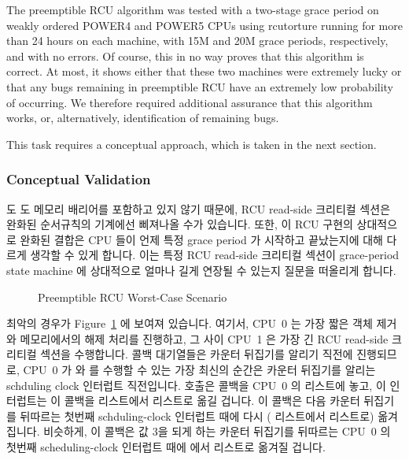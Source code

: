 The preemptible RCU algorithm was tested with a two-stage grace period
on weakly ordered POWER4 and POWER5 CPUs using rcutorture running for
more than 24 hours on each machine, with 15M and 20M grace periods,
respectively, and with no errors.
Of course, this in no way proves that this algorithm is correct.
At most, it shows either that these two machines were extremely
lucky or that any bugs remaining in preemptible RCU have an extremely
low probability of occurring.
We therefore required additional assurance that this algorithm works,
or, alternatively, identification of remaining bugs.

This task requires a conceptual approach,
which is taken in the next section.
\fi

\subsubsection{Conceptual Validation}
\label{app:rcuimpl:Conceptual Validation}

 도  도 메모리 배리어를 포함하고 있지
않기 때문에, RCU read-side 크리티컬 섹션은 완화된 순서규칙의 기계에선 삐져나올
수가 있습니다.
또한, 이 RCU 구현의 상대적으로 완화된 결합은 CPU 들이 언제 특정 grace period 가
시작하고 끝났는지에 대해 다르게 생각할 수 있게 합니다.
이는 특정 RCU read-side 크리티컬 섹션이 grace-period state machine 에
상대적으로 얼마나 길게 연장될 수 있는지 질문을 떠올리게 합니다.

\begin{figure}[htb]
\centering
{}
\caption{Preemptible RCU Worst-Case Scenario}
\label{app:rcuimpl:Preemptible RCU Worst-Case Scenario}
\end{figure}

최악의 경우가
Figure~\ref{app:rcuimpl:Preemptible RCU Worst-Case Scenario}
에 보여져 있습니다.
여기서, CPU~0 는 가장 짧은 객체 제거와 메모리에서의 해제 처리를 진행하고, 그
사이 CPU~1 은 가장 긴 RCU read-side 크리티컬 섹션을 수행합니다.
콜백 대기열들은 카운터 뒤집기를 알리기 직전에 진행되므로, CPU~0 가
 와  를 수행할 수 있는 가장 최신의 순간은
카운터 뒤집기를 알리는 schduling clock 인터럽트 직전입니다.
 호출은 콜백을 CPU~0 의  리스트에 놓고, 이 인터럽트는
이 콜백을  리스트에서  리스트로 옮길 겁니다.
이 콜백은 다음 카운터 뒤집기를 뒤따르는 첫번째 schduling-clock 인터럽트 때에
다시 ( 리스트에서  리스트로) 옮겨집니다.
비슷하게, 이 콜백은 값 3을 되게 하는 카운터 뒤집기를 뒤따르는 CPU~0 의 첫번째
scheduling-clock 인터럽트 때에  에서  리스트로 옮겨질
겁니다.
\iffalse

